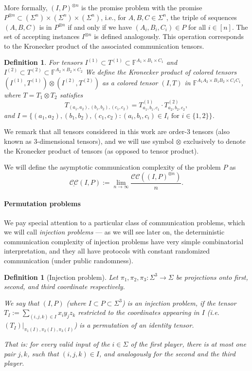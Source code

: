\documentclass[10pt,a4paper]{article}
\newtheorem{definition}[theorem]{Definition}
\newcommand{\F}{\mathbb{F}}
\newcommand{\cc}{\mathcal{CC}}
\newcommand{\acc}{\underline{\cc}}
\begin{document}
More formally, $(I, P)^{\otimes n}$ is the promise problem with the promise $P^{\otimes n} \subset (\Sigma^n) \times (\Sigma^n) \times (\Sigma^n)$, i.e., for $A,B,C \in \Sigma^n$, the triple of sequences $(A, B, C)$ is in $P^{\otimes n}$ if and only if we have $(A_i, B_i, C_i) \in P$ for all $i \in [n]$. The set of accepting instances $I^{\otimes n}$ is defined analogously. This operation corresponds to the Kronecker product of the associated communication tensors.
\begin{definition}
    For tensors $I^{(1)} \subset T^{(1)} \subset \F^{A_1 \times B_1 \times C_1}$ and $I^{(2)} \subset T^{(2)} \subset \F^{A_2 \times B_2 \times C_2}$ We define the Kronecker product of colored tensors $(I^{(1)}, T^{(1)}) \otimes (I^{(2)}, T^{(2)})$ as a colored tensor $(I, T)$ in $\F^{A_1 A_2 \times B_1 B_2 \times C_1 C_1}$, where $T = T_1 \otimes T_2$ satisfies 
    \begin{equation*}
    T_{(a_1,a_2), (b_1, b_2), (c_1, c_2)} = T^{(1)}_{a_1,b_1,c_1} \cdot T^{(2)}_{a_2,b_2,c_2},
    \end{equation*}
    and $I = \{(a_1, a_2), (b_1, b_2), (c_1, c_2) : (a_i, b_i, c_i) \in I_i \text{ for } i \in \{1,2\}\}$.
\end{definition}

We remark that all tensors considered in this work are order-3 tensors (also known as 3-dimensional tensors), and we will use symbol $\otimes$ exclusively to denote the Kronecker product of tensors (as opposed to tensor product).

We will define the asymptotic communication complexity of the problem $P$ as
\begin{equation*}
    \acc(I,P) := \lim_{n\to\infty} \frac{\cc( (I, P)^{\otimes n})}{n}.
\end{equation*}

\paragraph{Permutation problems}
We pay special attention to a particular class of communication problems, which we will call \emph{injection problems} --- as we will see later on, the deterministic communication complexity of injection problems have very simple combinatorial interpretation, and they all have protocols with constant randomized communication (under public randomness).

\begin{definition}[Injection problem]
    Let $\pi_1, \pi_2, \pi_3 : \Sigma^3 \to \Sigma$ be projections onto first, second, and third coordinate respectively.
    
    We say that $(I, P)$ (where $I \subset P \subset \Sigma^3$) is an \emph{injection problem},
    if the tensor $T_I := \sum_{(i,j,k) \in I} x_i y_j z_k$  restricted to the coordinates appearing in $I$ (i.e. $(T_I)|_{\pi_1(I), \pi_2(I), \pi_3(I)}$) is a permutation of an identity tensor.
    
    That is: for every valid input of the $i \in \Sigma$ of the first player, there is at most one pair $j, k$, such that $(i,j,k) \in I$, and analogously for the second and the third player.
\end{definition}
\end{document}
